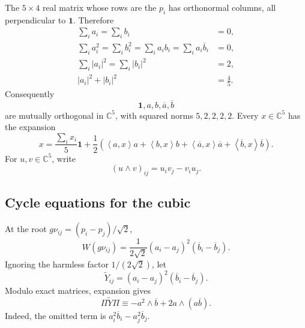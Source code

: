 \documentclass[11pt,reqno]{amsart}
\theoremstyle{definition}
\theoremstyle{remark}
\newcommand{\C}{\mathbb C}
\newcommand{\one}{\mathbf 1}
\newcommand{\ip}[2]{\left\langle #1,#2\right\rangle}
\newcommand{\abs}[1]{\left\lvert #1\right\rvert}
\begin{document}
The $5\times4$ real matrix whose rows are the $p_i$ has orthonormal columns,
all perpendicular to $\one$.  Therefore
\begin{align}
\sum_i a_i=\sum_i b_i&=0,\label{eq:frame-sums}\\
\sum_i a_i^2=\sum_i b_i^2
=\sum_i a_ib_i=\sum_i a_i\overline b_i&=0,\label{eq:frame-orthog}\\
\sum_i\abs{a_i}^2=\sum_i\abs{b_i}^2&=2,\label{eq:frame-norms}\\
\abs{a_i}^2+\abs{b_i}^2&=\frac45.\label{eq:row-norm}
\end{align}
Consequently
\[
\one,a,b,\overline a,\overline b
\]
are mutually orthogonal in $\C^5$, with squared norms $5,2,2,2,2$.
Every $x\in\C^5$ has the expansion
\begin{equation}\label{eq:basis-expansion}
x=\frac{\sum_i x_i}{5}\one
+\frac12\left(
\ip{a}{x}a+\ip{b}{x}b
+\ip{\overline a}{x}\overline a
+\ip{\overline b}{x}\overline b
\right).
\end{equation}
For $u,v\in\C^5$, write
\[
(u\wedge v)_{ij}=u_iv_j-v_iu_j.
\]

\subsection{Cycle equations for the cubic}

At the root $g\nu_{ij}=(p_i-p_j)/\sqrt2$,
\[
W(g\nu_{ij})
=\frac1{2\sqrt2}(a_i-a_j)^2(\overline b_i-\overline b_j).
\]
Ignoring the harmless factor $1/(2\sqrt2)$, let
\[
\widetilde Y_{ij}=(a_i-a_j)^2(\overline b_i-\overline b_j).
\]
Modulo exact matrices, expansion gives
\begin{equation}\label{eq:cubic-cycle-form}
\Pi\widetilde Y\Pi
\equiv -a^2\wedge\overline b+2a\wedge(a\overline b).
\end{equation}
Indeed, the omitted term is
$a_i^2\overline b_i-a_j^2\overline b_j$.
\end{document}
